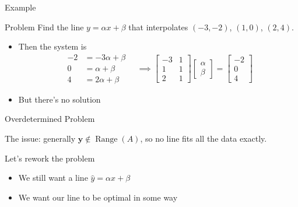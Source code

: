 \documentclass[10pt]{beamer}
\begin{document}
\begin{frame}{Example}


\begin{block}{Problem}    
    Find the line $y=\alpha x+\beta$ that interpolates $(-3,-2)$, $(1,0)$, $(2,4)$. 
\end{block}

\begin{itemize}
    \item Then the system is 
    $$
    \begin{aligned}
        -2 &= -3\alpha + \beta\\
        0 &= \alpha + \beta \\
        4 &= 2\alpha + \beta
    \end{aligned} \quad \implies \begin{bmatrix}
            -3 & 1\\
            1 & 1\\
            2 & 1
        \end{bmatrix} \begin{bmatrix}
            \alpha\\\beta
        \end{bmatrix}= \begin{bmatrix}
            -2\\0\\4
        \end{bmatrix}
    $$
    \item<2-> But there's no solution

\end{itemize}
\end{frame}


\begin{frame}{Overdetermined Problem}

The issue: generally $\mathbf{y}\notin\operatorname{Range}(A)$, so no line fits all the data exactly.


    \bigskip
Let's rework the problem
    \begin{itemize}
    
    \item We still want a line $\hat{y}=\alpha x+\beta$
    \item We want our line to be optimal in some way
    \end{itemize}

\end{frame}
\end{document}

